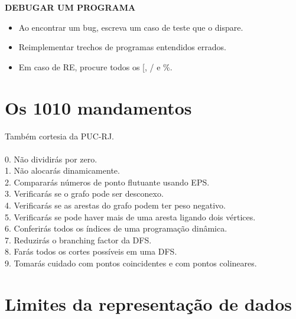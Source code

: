 \textbf{DEBUGAR UM PROGRAMA}
\begin{itemize}
\itemsep0em
\item Ao encontrar um bug, escreva um caso de teste que o dispare.
\item Reimplementar trechos de programas entendidos errados.
\item Em caso de RE, procure todos os [, / e \%.
\end{itemize}

\section{Os 1010 mandamentos}

Também cortesia da PUC-RJ.
\\\\
0. Não dividirás por zero.\\
1. Não alocarás dinamicamente.\\
2. Compararás números de ponto flutuante usando EPS.\\
3. Verificarás se o grafo pode ser desconexo.\\
4. Verificarás se as arestas do grafo podem ter peso negativo.\\
5. Verificarás se pode haver mais de uma aresta ligando dois vértices.\\
6. Conferirás todos os índices de uma programação dinâmica.\\
7. Reduzirás o branching factor da DFS.\\
8. Farás todos os cortes possíveis em uma DFS.\\
9. Tomarás cuidado com pontos coincidentes e com pontos colineares.\\

\newpage

\section{Limites da representação de dados}

